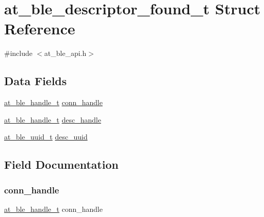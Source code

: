 \hypertarget{structat__ble__descriptor__found__t}{}\section{at\+\_\+ble\+\_\+descriptor\+\_\+found\+\_\+t Struct Reference}
\label{structat__ble__descriptor__found__t}


{\ttfamily \#include $<$at\+\_\+ble\+\_\+api.\+h$>$}

\subsection*{Data Fields}
\begin{DoxyCompactItemize}
\item 
\mbox{\hyperlink{at__ble__api_8h_abd23646d0c662860741f787efc8456f2}{at\+\_\+ble\+\_\+handle\+\_\+t}} \mbox{\hyperlink{structat__ble__descriptor__found__t_ae42df6fd8493f8f8faeccfdd6062e96f}{conn\+\_\+handle}}
\item 
\mbox{\hyperlink{at__ble__api_8h_abd23646d0c662860741f787efc8456f2}{at\+\_\+ble\+\_\+handle\+\_\+t}} \mbox{\hyperlink{structat__ble__descriptor__found__t_a7c7b26f9ebee6a007ea08858709cc696}{desc\+\_\+handle}}
\item 
\mbox{\hyperlink{structat__ble__uuid__t}{at\+\_\+ble\+\_\+uuid\+\_\+t}} \mbox{\hyperlink{structat__ble__descriptor__found__t_a6b978f9d193b259230121ad4c455799a}{desc\+\_\+uuid}}
\end{DoxyCompactItemize}


\subsection{Field Documentation}
\mbox{\label{structat__ble__descriptor__found__t_ae42df6fd8493f8f8faeccfdd6062e96f}} 
\subsubsection{\texorpdfstring{conn\_handle}{conn\_handle}}
{\footnotesize\ttfamily \mbox{\hyperlink{at__ble__api_8h_abd23646d0c662860741f787efc8456f2}{at\+\_\+ble\+\_\+handle\+\_\+t}} conn\+\_\+handle}

\mbox{\label{structat__ble__descriptor__found__t_a7c7b26f9ebee6a007ea08858709cc696}} 
